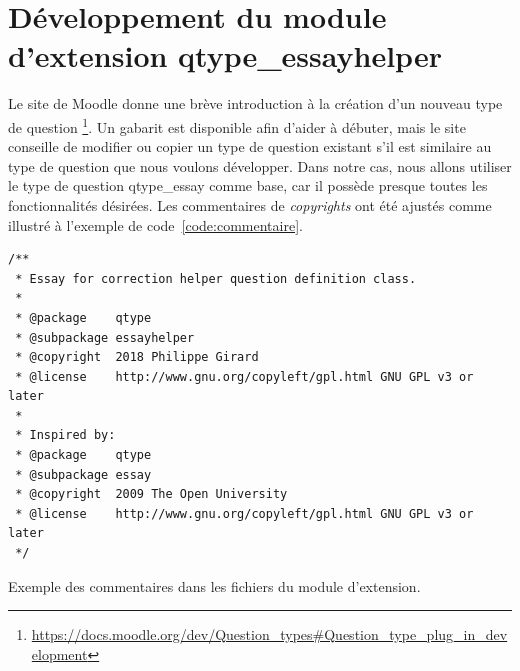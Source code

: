 \chapter{D\'eveloppement du module d'extension \og qtype\_essayhelper \fg{} }
Le site de Moodle donne une br\`eve introduction \`a la cr\'eation d'un nouveau type de question \footnote{\url{https://docs.moodle.org/dev/Question\_types\#Question\_type\_plug\_in\_development}}.
Un gabarit est disponible afin d'aider \`a d\'ebuter, mais le site conseille de modifier ou copier un type de question existant s'il est similaire au type de question que nous voulons d\'evelopper.
Dans notre cas, nous allons utiliser le type de question \og qtype\_essay \fg{} comme base, car il poss\`ede presque toutes les fonctionnalit\'es d\'esir\'ees.
Les commentaires de \emph{copyrights} ont \'et\'e ajust\'es comme illustr\'e \`a l'exemple de code~\ref{code:commentaire}.
\begin{lstfloat}
\begin{lstlisting}[frame=l]
/**
 * Essay for correction helper question definition class.
 *
 * @package    qtype
 * @subpackage essayhelper
 * @copyright  2018 Philippe Girard
 * @license    http://www.gnu.org/copyleft/gpl.html GNU GPL v3 or later
 *
 * Inspired by:
 * @package    qtype
 * @subpackage essay
 * @copyright  2009 The Open University
 * @license    http://www.gnu.org/copyleft/gpl.html GNU GPL v3 or later
 */
\end{lstlisting}
\caption{Exemple des commentaires dans les fichiers du module d'extension.}
\label{code:commentaire}
\end{lstfloat}
